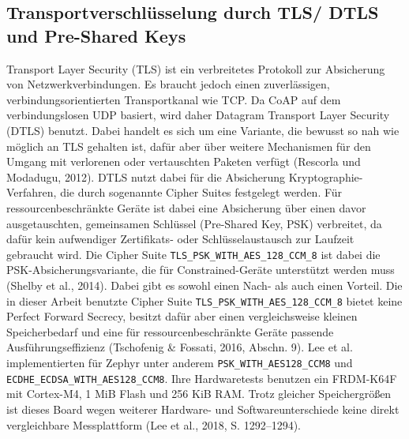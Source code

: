 \subsection{Transportverschl{\"u}sselung durch TLS/ DTLS und Pre-Shared Keys}
Transport Layer Security (TLS) ist ein verbreitetes Protokoll zur Absicherung von Netzwerkverbindungen. Es braucht jedoch einen zuverl{\"a}ssigen, verbindungsorientierten Transportkanal wie TCP. Da CoAP auf dem verbindungslosen UDP basiert, wird daher Datagram Transport Layer Security (DTLS) benutzt. Dabei handelt es sich um eine Variante, die bewusst so nah wie m{\"o}glich an TLS gehalten ist, daf{\"u}r aber {\"u}ber weitere Mechanismen f{\"u}r den Umgang mit verlorenen oder vertauschten Paketen verf{\"u}gt (Rescorla und Modadugu, 2012). DTLS nutzt dabei f{\"u}r die Absicherung Kryptographie-Verfahren, die durch sogenannte Cipher Suites festgelegt werden. F{\"u}r ressourcenbeschr{\"a}nkte Ger{\"a}te ist dabei eine Absicherung {\"u}ber einen davor ausgetauschten, gemeinsamen Schl{\"u}ssel (Pre-Shared Key, PSK) verbreitet, da daf{\"u}r kein aufwendiger Zertifikats- oder Schl{\"u}sselaustausch zur Laufzeit gebraucht wird. Die Cipher Suite \lstinline[style=codeinline]|TLS_PSK_WITH_AES_128_CCM_8| ist dabei die PSK-Absicherungsvariante, die f{\"u}r Constrained-Ger{\"a}te unterst{\"u}tzt werden muss (Shelby et al., 2014). Dabei gibt es sowohl einen Nach- als auch einen Vorteil. Die in dieser Arbeit benutzte Cipher Suite \lstinline[style=codeinline]|TLS_PSK_WITH_AES_128_CCM_8| bietet keine Perfect Forward Secrecy, besitzt daf{\"u}r aber einen vergleichsweise kleinen Speicherbedarf und eine f{\"u}r ressourcenbeschr{\"a}nkte Ger{\"a}te passende Ausf{\"u}hrungseffizienz (Tschofenig \& Fossati, 2016, Abschn. 9). Lee et al. implementierten f{\"u}r Zephyr unter anderem \lstinline[style=codeinline]|PSK_WITH_AES128_CCM8| und \lstinline[style=codeinline]|ECDHE_ECDSA_WITH_AES128_CCM8|. Ihre Hardwaretests benutzen ein FRDM-K64F mit Cortex-M4, 1 MiB Flash und 256 KiB RAM. Trotz gleicher Speichergr{\"o}{\ss}en ist dieses Board wegen weiterer Hardware- und Softwareunterschiede keine direkt vergleichbare Messplattform (Lee et al., 2018, S. 1292--1294).

